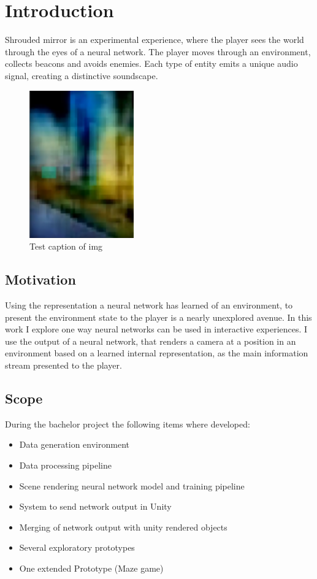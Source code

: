 
\chapter{Introduction}
Shrouded mirror is an experimental experience, where the player sees the world through the eyes of a neural network. The player moves through an environment, collects beacons and avoids enemies. Each type of entity emits a unique audio signal, creating a distinctive soundscape.
\begin{figure}[hbt]
\centering
    \includegraphics[width=0.4\textwidth]{images/FrontCover.png}
    \caption{Test caption of img}
\end{figure}

\section{Motivation}
Using the representation a neural network has learned of an environment, to present the environment state to the player is a nearly unexplored avenue.
In this work I explore one way neural networks can be used in interactive experiences. I use the output of a neural network, that renders a camera at a position in an environment based on a learned internal representation, as the main information stream presented to the player.

\section{Scope}
During the bachelor project the following items where developed:

\begin{itemize}
\item{Data generation environment}
\item{Data processing pipeline}
\item{Scene rendering neural network model and training pipeline}
\item{System to send network output in Unity}
\item{Merging of network output with unity rendered objects}
\item{Several exploratory prototypes}
\item{One extended Prototype (Maze game)}
\end{itemize}
